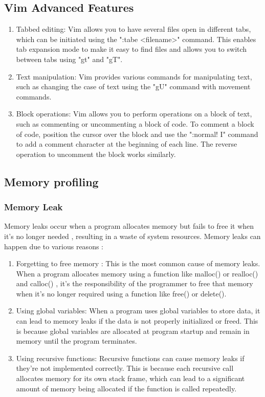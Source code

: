 \documentclass[titlepage]{article}
\begin{document}
	\subsection{Vim Advanced Features}
	\begin{enumerate}
	  \item Tabbed editing: Vim allows you to have several files open in different tabs, which can be initiated using the ":tabe <filename>"  command. This enables tab expansion mode to make it easy to find files and allows you to switch between tabs using "gt" and "gT".
	  \item Text manipulation: Vim provides various commands for manipulating text, such as changing the case of text using the "gU" command with movement commands. 
	  \item Block operations: Vim allows you to perform operations on a block of text, such as commenting or uncommenting a block of code. To comment a block of code, position the cursor over the block and use the ":normal! I" command to add a comment character at the beginning of each line. The reverse operation to uncomment the block works similarly.
	 \end{enumerate}
	
	\subsection{Memory profiling}
	\subsubsection{Memory Leak}
	Memory leaks occur when a program allocates memory but fails to free it when it's no longer needed , resulting in a waste of system resources. Memory leaks can happen due to various reasons :
	\begin{enumerate}
		\item Forgetting to free memory : This is the most common cause of memory leaks. When a program allocates memory using a function like malloc() or realloc() and calloc() , it's the responsibility of the programmer to free that memory when it's no longer required using a function like free() or delete().
		\item Using global variables: When a program uses global variables to store data, it can lead to memory leaks if the data is not properly initialized or freed. This is because global variables are allocated at program startup and remain in memory until the program terminates.
		\item Using recursive functions: Recursive functions can cause memory leaks if they're not implemented correctly. This is because each recursive call allocates memory for its own stack frame, which can lead to a significant amount of memory being allocated if the function is called repeatedly.
	\end{enumerate}
	
\end{document}
